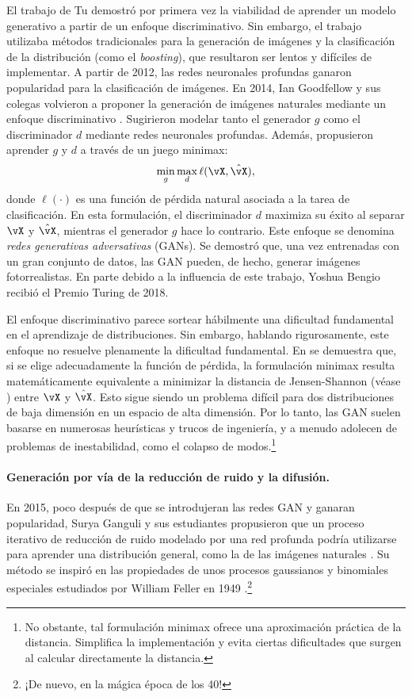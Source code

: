 \documentclass[../../book-main_es.tex]{subfiles}
\begin{document}
El trabajo de Tu \cite{Tu-2007} demostró por primera vez la viabilidad de
aprender un modelo generativo a partir de un enfoque discriminativo. Sin embargo,
el trabajo utilizaba métodos tradicionales para la generación de imágenes y
la clasificación de la distribución (como el \textit{boosting}), que resultaron ser lentos y
difíciles de implementar. A partir de 2012, las redes neuronales profundas ganaron
popularidad para la clasificación de imágenes. En 2014, Ian Goodfellow y
sus colegas volvieron a proponer la generación de imágenes naturales mediante un
enfoque discriminativo \cite{Goodfellow-2014}. Sugirieron
modelar tanto el generador \(g\) como el discriminador \(d\) mediante
redes neuronales profundas. Además, propusieron aprender \(g\) y \(d\) a través de
un juego minimax:
\begin{equation}
    \min_{g} \max_{d} \ell(\vX, \hat{\vX}),
\end{equation}
donde \(\ell(\cdot)\) es una función de pérdida natural asociada a
la tarea de clasificación. En esta formulación, el discriminador \(d\)
maximiza su éxito al separar \(\vX\) y \(\hat{\vX}\), mientras el
generador \(g\) hace lo contrario. Este enfoque  se denomina
\textit{redes generativas adversativas} (GANs). Se demostró que,
una vez entrenadas con un gran conjunto de datos, las GAN pueden, de hecho, generar
imágenes fotorrealistas. En parte debido a la influencia de este trabajo,
Yoshua Bengio recibió el Premio Turing de 2018.

El enfoque discriminativo parece sortear hábilmente una dificultad fundamental
en el aprendizaje de distribuciones. Sin embargo, hablando rigurosamente,
este enfoque no resuelve plenamente la dificultad fundamental. En
\cite{Goodfellow-2014} se demuestra que, si se elige adecuadamente la función de pérdida,
la formulación minimax resulta matemáticamente equivalente a
minimizar la distancia de Jensen-Shannon (véase \cite{Cover-Thomas})
entre \(\vX\) y \(\hat{\vX}\). Esto sigue siendo un problema difícil
para dos distribuciones de baja dimensión en un espacio de alta dimensión.
Por lo tanto, las GAN suelen basarse en numerosas heurísticas y
trucos de ingeniería, y a menudo adolecen de problemas de inestabilidad, como el
colapso de modos.\footnote{No obstante, tal formulación minimax
    ofrece una aproximación práctica de la distancia. Simplifica
    la implementación y evita ciertas dificultades que surgen al 
calcular directamente la distancia.}

\paragraph{Generación por vía de la reducción de ruido y la difusión.}
En 2015, poco después de que se introdujeran las redes GAN y ganaran popularidad,
Surya Ganguli y sus estudiantes propusieron que un proceso iterativo de reducción de ruido
modelado por una red profunda podría utilizarse para aprender una distribución general,
como la de las imágenes naturales \cite{Sohl-Dickstein2015}. Su método se inspiró en las 
propiedades de unos procesos gaussianos y binomiales especiales estudiados por William 
Feller en 1949 \cite{Feller1949OnTT}.\footnote{¡De nuevo, en la mágica época de los 40!}
\end{document}
